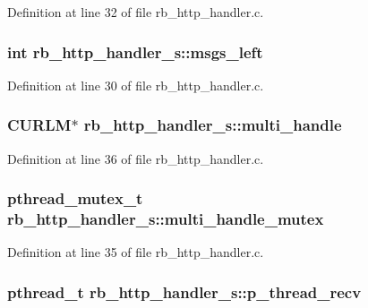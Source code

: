 Definition at line 32 of file rb\-\_\-http\-\_\-handler.\-c.

\hypertarget{structrb__http__handler__s_a803db851c00a617f8a80f00f29d9dba3}{
\subsubsection[{msgs\-\_\-left}]{\setlength{\rightskip}{0pt plus 5cm}int rb\-\_\-http\-\_\-handler\-\_\-s\-::msgs\-\_\-left}}\label{structrb__http__handler__s_a803db851c00a617f8a80f00f29d9dba3}


Definition at line 30 of file rb\-\_\-http\-\_\-handler.\-c.

\hypertarget{structrb__http__handler__s_a45c0ce1f2e4d154d0194bb60569c0faf}{
\subsubsection[{multi\-\_\-handle}]{\setlength{\rightskip}{0pt plus 5cm}C\-U\-R\-L\-M$\ast$ rb\-\_\-http\-\_\-handler\-\_\-s\-::multi\-\_\-handle}}\label{structrb__http__handler__s_a45c0ce1f2e4d154d0194bb60569c0faf}


Definition at line 36 of file rb\-\_\-http\-\_\-handler.\-c.

\hypertarget{structrb__http__handler__s_add4e2b7495e2f20396c2e70ab1a27bf4}{
\subsubsection[{multi\-\_\-handle\-\_\-mutex}]{\setlength{\rightskip}{0pt plus 5cm}pthread\-\_\-mutex\-\_\-t rb\-\_\-http\-\_\-handler\-\_\-s\-::multi\-\_\-handle\-\_\-mutex}}\label{structrb__http__handler__s_add4e2b7495e2f20396c2e70ab1a27bf4}


Definition at line 35 of file rb\-\_\-http\-\_\-handler.\-c.

\hypertarget{structrb__http__handler__s_a4d36d51983f56eac71371a39ee421242}{
\subsubsection[{p\-\_\-thread\-\_\-recv}]{\setlength{\rightskip}{0pt plus 5cm}pthread\-\_\-t rb\-\_\-http\-\_\-handler\-\_\-s\-::p\-\_\-thread\-\_\-recv}}\label{structrb__http__handler__s_a4d36d51983f56eac71371a39ee421242}


